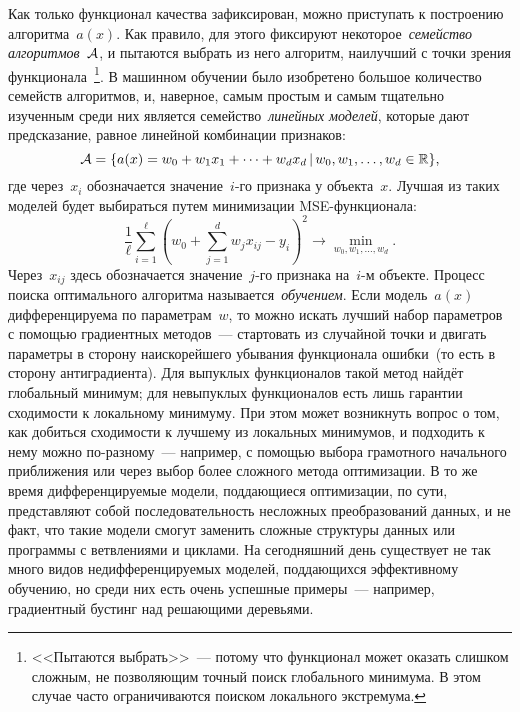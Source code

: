 \documentclass[12pt,fleqn]{article}
\begin{document}
Как только функционал качества зафиксирован, можно приступать к построению алгоритма~$a(x)$.
Как правило, для этого фиксируют некоторое~\emph{семейство алгоритмов}~$\AA$,
и пытаются выбрать из него алгоритм, наилучший с точки зрения функционала~\footnote{<<Пытаются выбрать>>~---
    потому что функционал может оказать слишком сложным, не позволяющим точный поиск глобального
    минимума. В этом случае часто ограничиваются поиском локального экстремума.}.
В машинном обучении было изобретено большое количество семейств алгоритмов, и, наверное,
самым простым и самым тщательно изученным среди них является семейство~\emph{линейных моделей},
которые дают предсказание, равное линейной комбинации признаков:
\[
    \AA
    =
    \{
        a(x) = w_0 + w_1 x_1 + \dots + w_d x_d
        \cond
        w_0, w_1, \dots, w_d \in \RR
    \},
\]
где через~$x_i$ обозначается значение~$i$-го признака у объекта~$x$.
Лучшая из таких моделей будет выбираться путем минимизации MSE-функционала:
\[
    \frac{1}{\ell}
    \sum_{i = 1}^{\ell} \left(
        w_0
        +
        \sum_{j = 1}^{d}
            w_j x_{ij}
        -
        y_i
    \right)^2
    \to \min_{w_0, w_1, \dots, w_d}.
\]
Через~$x_{ij}$ здесь обозначается значение~$j$-го признака на~$i$-м объекте.
Процесс поиска оптимального алгоритма называется~\emph{обучением}.
Если модель~$a(x)$ дифференцируема по параметрам~$w$, то можно искать лучший набор параметров
с помощью градиентных методов~--- стартовать из случайной точки и двигать параметры в сторону наискорейшего
убывания функционала ошибки~(то есть в сторону антиградиента).
Для выпуклых функционалов такой метод найдёт глобальный минимум;
для невыпуклых функционалов есть лишь гарантии сходимости к локальному минимуму.
При этом может возникнуть вопрос о том, как добиться сходимости к лучшему из локальных минимумов,
и подходить к нему можно по-разному~--- например, с помощью выбора грамотного начального приближения
или через выбор более сложного метода оптимизации.
В то же время дифференцируемые модели, поддающиеся оптимизации,
по сути, представляют собой последовательность несложных преобразований данных, и
не факт, что такие модели смогут заменить сложные структуры данных или программы с ветвлениями и циклами.
На сегодняшний день существует не так много видов недифференцируемых моделей, поддающихся эффективному обучению,
но среди них есть очень успешные примеры~--- например, градиентный бустинг над решающими деревьями.
\end{document}
